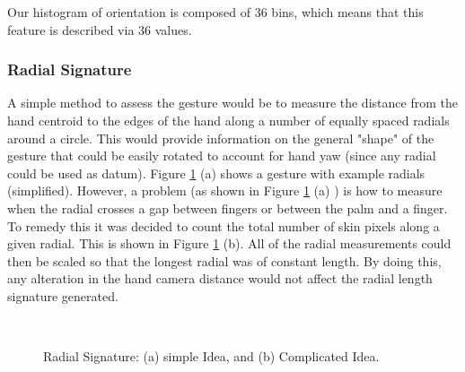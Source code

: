 Our histogram of orientation is composed of 36 bins, which means that this feature is described via 36 values.
\bigskip
\subsubsection{Radial Signature}
A simple method to assess the gesture would be to measure the distance from the hand centroid to the edges of the hand along a number of equally spaced radials \cite{feature4} around a circle. This would provide information on the general "shape" of the gesture that could be easily rotated to account for hand yaw (since any radial could be used as datum).
\bigskip
Figure \ref{fig:radial_sig} (a) shows a gesture with example radials (simplified).
However, a problem (as shown in Figure \ref{fig:radial_sig} (a) ) is how to measure when the radial crosses a gap between fingers or between the palm and a finger. To remedy this it was decided to count the total number of skin pixels along a given radial. This is shown in Figure \ref{fig:radial_sig} (b). All of the radial measurements could then be scaled so that the longest radial was of constant length. By doing this, any alteration in the hand camera distance would not affect the radial length signature generated.

\begin{figure}[h]
\begin{dBox}
\centering
  \mbox{
   }
   \caption{Radial Signature: (a) simple Idea, and (b) Complicated Idea. \cite{feature4} \label{fig:radial_sig} }   
\end{dBox}   
\end{figure}

